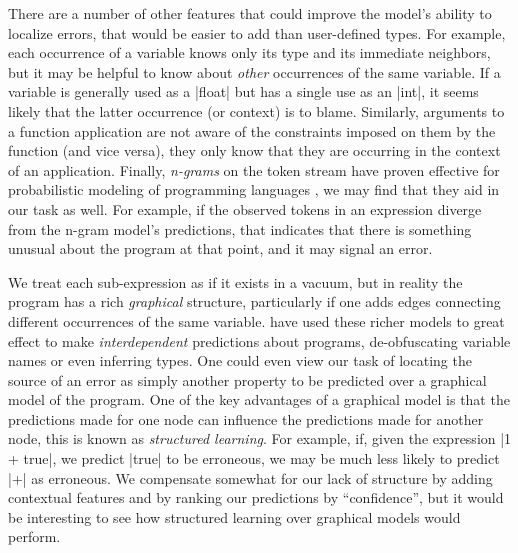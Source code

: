 There are a number of other features that could improve the model's
ability to localize errors, that would be easier to add than
user-defined types.
%
For example, each occurrence of a variable knows only its type and its
immediate neighbors, but it may be helpful to know
about \emph{other} occurrences of the same variable.
%
If a variable is generally used as a |float| but has a
single use as an |int|, it seems likely that the
latter occurrence (or context) is to blame.
%
Similarly, arguments to a function application are not aware of the
constraints imposed on them by the function (and vice versa),
they only know that they are occurring in the context of an application.
%
Finally, \emph{n-grams} on the token stream have proven effective for
probabilistic modeling of programming languages
\citep{Hindle2012-hf,Gabel2010-el}, we may find that they aid in
our task as well.
%
For example, if the observed tokens in an expression diverge from the
n-gram model's predictions, that indicates that there is something
unusual about the program at that point, and it may signal an error.


We treat each sub-expression as if it exists in a vacuum, but in reality
the program has a rich \emph{graphical} structure, particularly if one adds
edges connecting different occurrences of the same variable.
%
\citet{Raychev2015-jg} have used these richer models to great effect to
make \emph{interdependent} predictions about programs, \eg
de-obfuscating variable names or even inferring types.
%
One could even view our task of locating the source of an error as simply
another property to be predicted over a graphical model of the program.
%
One of the key advantages of a graphical model is that the predictions
made for one node can influence the predictions made for another node,
this is known as \emph{structured learning}.
%
For example, if, given the expression |1 + true|, we predict |true| to
be erroneous, we may be much less likely to predict |+| as erroneous.
%
We compensate somewhat for our lack of structure by adding contextual
features and by ranking our predictions by ``confidence'', but it would
be interesting to see how structured learning over graphical models
would perform.


